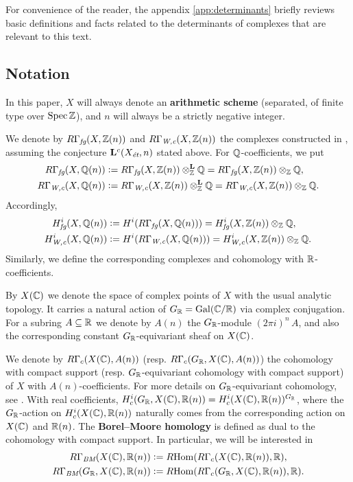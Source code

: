 \documentclass{article}
\numberwithin{equation}{section}
\begin{document}
For convenience of the reader, the appendix \ref{app:determinants} briefly
reviews basic definitions and facts related to the determinants of complexes
that are relevant to this text.

\subsection*{Notation}

In this paper, $X$ will always denote an \textbf{arithmetic scheme} (separated,
of finite type over $\Spec \ZZ$), and $n$ will always be a strictly negative
integer.

We denote by $R\Gamma_\fg (X, \ZZ (n))$ and $R\Gamma_\Wc (X, \ZZ (n))$ the
complexes constructed in \cite{Beshenov-Weil-etale-1}, assuming the conjecture
$\mathbf{L}^c (X_\et,n)$ stated above. For $\QQ$-coefficients, we put
\begin{align*}
  R\Gamma_\fg (X, \QQ (n)) & \dfn
  R\Gamma_\fg (X, \ZZ (n)) \otimes_\ZZ^\mathbf{L} \QQ =
  R\Gamma_\fg (X, \ZZ (n)) \otimes_\ZZ \QQ, \\
  R\Gamma_\Wc (X, \QQ (n)) & \dfn
  R\Gamma_\Wc (X, \ZZ (n)) \otimes_\ZZ^\mathbf{L} \QQ =
  R\Gamma_\Wc (X, \ZZ (n)) \otimes_\ZZ \QQ.
\end{align*}
Accordingly,
\begin{align*}
  H^i_\fg (X, \QQ (n)) & \dfn
  H^i (R\Gamma_\fg (X, \QQ (n))) = H^i_\fg (X, \ZZ (n)) \otimes_\ZZ \QQ, \\
  H^i_\Wc (X, \QQ (n)) & \dfn
  H^i (R\Gamma_\Wc (X, \QQ (n))) = H^i_\Wc (X, \ZZ (n)) \otimes_\ZZ \QQ.
\end{align*}
Similarly, we define the corresponding complexes and cohomology with
$\RR$-coefficients.

By $X (\CC)$ we denote the space of complex points of $X$ with the usual
analytic topology. It carries a natural action of $G_\RR = \Gal (\CC/\RR)$ via
complex conjugation. For a subring $A \subseteq \RR$ we denote by $A (n)$ the
$G_\RR$-module $(2\pi i)^n\,A$, and also the corresponding constant
$G_\RR$-equivariant sheaf on $X (\CC)$.

We denote by $R\Gamma_c (X (\CC), A (n))$
(resp. $R\Gamma_c (G_\RR, X (\CC), A (n))$) the cohomology with compact
support (resp. $G_\RR$-equivariant cohomology with compact support) of $X$ with
$A (n)$-coefficients. For more details on $G_\RR$-equivariant cohomology,
see \cite{Beshenov-Weil-etale-1}. With real coefficients,
$H_c^i (G_\RR, X (\CC), \RR (n)) = H^i_c (X (\CC), \RR (n))^{G_\RR}$,
where the $G_\RR$-action on $H^i_c (X (\CC), \RR (n))$ naturally comes from the
corresponding action on $X (\CC)$ and $\RR (n)$.
The \textbf{Borel--Moore homology} is defined as dual to the cohomology with
compact support. In particular, we will be interested in
\begin{align*}
  R\Gamma_\BM (X (\CC), \RR (n)) & \dfn
  \RHom (R\Gamma_c (X (\CC), \RR (n)), \RR), \\
  R\Gamma_\BM (G_\RR, X (\CC), \RR (n)) & \dfn
  \RHom (R\Gamma_c (G_\RR, X (\CC), \RR (n)), \RR).
\end{align*}
\end{document}
